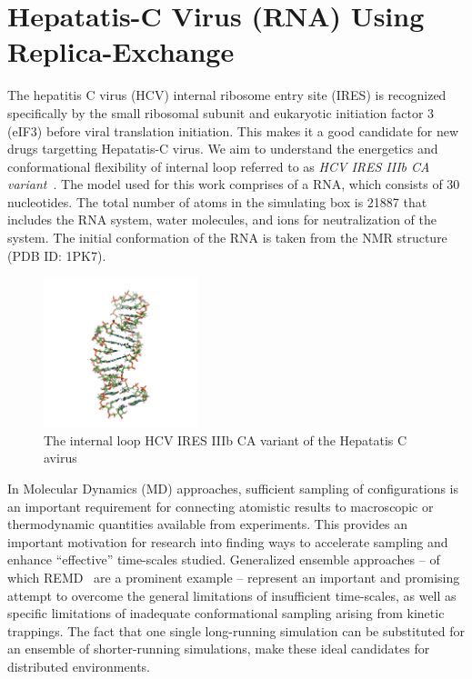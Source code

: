 \documentclass{rspublic}
\newcommand{\jhanote}[1]{ {\textcolor{red} { ***SJ: #1 }}}
\newcommand{\jhanote}[1]{}
\begin{document}
\section{Hepatatis-C Virus (RNA) Using Replica-Exchange}


The hepatitis C virus (HCV) internal ribosome entry site (IRES) is
recognized specifically by the small ribosomal subunit and eukaryotic
initiation factor 3 (eIF3) before viral translation initiation.  This
makes it a good candidate for new drugs targetting Hepatatis-C virus.
We aim to understand the energetics and conformational flexibility of
internal loop referred to as {\it HCV IRES IIIb CA
  variant}~\citep{Collier:2002wd}. The model used for this work
comprises of a RNA, which consists of 30
nucleotides. %
The total number of atoms in the simulating box is 21887 that includes
the RNA system, water molecules, and ions for neutralization of the
system.  The initial conformation of the RNA is taken from the NMR
structure (PDB ID: 1PK7).

\begin{figure}[t]
      \centering
      \includegraphics[width=0.4\textwidth]{1KP7}   
      \caption{The internal loop HCV IRES IIIb CA variant of the
        Hepatatis C avirus}
      \label{}
\end{figure}

In Molecular Dynamics (MD) approaches, sufficient sampling of
configurations is an important requirement for connecting atomistic
results to macroscopic or thermodynamic quantities available from
experiments.  
This provides an important motivation for research into finding ways
to accelerate sampling and enhance ``effective'' time-scales
studied. Generalized ensemble approaches -- of which
REMD~\citep{Sugita:1999rm} are a
prominent example -- represent an important and promising attempt to
overcome the general limitations of insufficient time-scales, as well
as specific limitations of inadequate conformational sampling arising
from kinetic trappings.  The fact that one single long-running
simulation can be substituted for an ensemble of shorter-running
simulations, make these ideal candidates for distributed environments.
\end{document}
